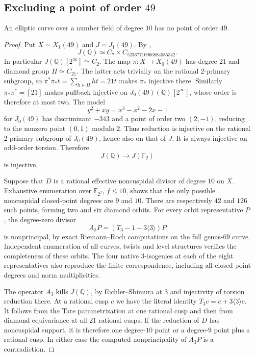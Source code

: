 \subsection{Excluding a point of order $49$}
\begin{proposition}\label{prop:decic-no49}
An elliptic curve over a number field of degree $10$ has no point of order $49$.
\end{proposition}
\begin{proof}
Put $X=X_1(49)$ and $J=J_1(49)$. By
\cite[Theorems~3.1 and 4.13, and Table~2]{DEHMZ},
\[
 J(\mathbb Q)\simeq C_7\times C_{52367710906884085342}.
\]
In particular $J(\mathbb Q)[2^\infty]\simeq C_2$.
The map $\pi:X\to X_0(49)$ has degree $21$ and diamond group
$H\simeq C_{21}$. The latter acts trivially on the rational
$2$-primary subgroup, so
$\pi^*\pi_*t=\sum_{h\in H}ht=21t$ makes $\pi_*$ injective there.
Similarly $\pi_*\pi^*=[21]$ makes pullback injective on
$J_0(49)(\mathbb Q)[2^\infty]$, whose order is therefore at most two.
The model
\[
 y^2+xy=x^3-x^2-2x-1
\]
for $J_0(49)$ has discriminant $-343$ and a point of order two
$(2,-1)$, reducing to the nonzero point $(0,1)$ modulo $2$.
Thus reduction is injective on the rational $2$-primary subgroup
of $J_0(49)$, hence also on that of $J$. It is always injective on
odd-order torsion. Therefore
\[
 J(\mathbb Q)\longrightarrow J(\mathbb F_2)
\]
is injective.

Suppose that $D$ is a rational effective noncuspidal divisor of
degree $10$ on $X$. Exhaustive enumeration over $\mathbb F_{2^f}$,
$f\leq10$, shows that the only possible noncuspidal closed-point
degrees are $9$ and $10$. There are respectively $42$ and $126$
such points, forming two and six diamond orbits. For every orbit
representative $P$, the degree-zero divisor
\[
 A_3P=(T_3-1-3\langle3\rangle)P
\]
is nonprincipal, by exact Riemann--Roch computations on the full
genus-$69$ curve. Independent enumeration of all curves, twists
and level structures verifies the completeness of these orbits.
The four native $3$-isogenies at each of the eight representatives
also reproduce the finite correspondence, including all closed
point degrees and norm multiplicities.

The operator $A_3$ kills $J(\mathbb Q)$, by Eichler--Shimura at $3$
and injectivity of torsion reduction there. At a rational cusp $c$
we have the literal identity $T_3c=c+3\langle3\rangle c$.
It follows from the Tate parametrization at one rational cusp and
then from diamond equivariance at all $21$ rational cusps.
If the reduction of $D$ has noncuspidal support, it is therefore
one degree-$10$ point or a degree-$9$ point plus a rational cusp.
In either case the computed nonprincipality of $A_3P$ is a
contradiction.


\end{proof}
